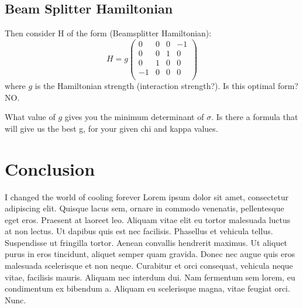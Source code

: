 \documentclass[11pt,a4paper]{article}
\numberwithin{equation}{section}
\begin{document}
	\subsection{Beam Splitter Hamiltonian}

	
	Then consider H of the form (Beamsplitter Hamiltonian):
	\begin{equation*}
	H = g\begin{pmatrix}
	0 & 0 & 0 & -1\\
	0 & 0 & 1 & 0\\
	0 & 1 & 0 & 0 \\
	-1 & 0 & 0 & 0 \\
	\end{pmatrix}
	\end{equation*} where $g$ is the Hamiltonian strength (interaction strength?). Is this optimal form? NO.
	
	What value of $g$ gives you the minimum determinant of $\sigma$. Is there a formula that will give us the best g, for your given chi and kappa values. 
	\fi	

	\color{red}\section{Conclusion}
	\label{sec:conc}
	
	
	I changed the world of cooling forever 
	Lorem ipsum dolor sit amet, consectetur adipiscing elit. Quisque lacus sem, ornare in commodo venenatis, pellentesque eget eros. Praesent at laoreet leo. Aliquam vitae elit eu tortor malesuada luctus at non lectus. Ut dapibus quis est nec facilisis. Phasellus et vehicula tellus. Suspendisse ut fringilla tortor. Aenean convallis hendrerit maximus. Ut aliquet purus in eros tincidunt, aliquet semper quam gravida. Donec nec augue quis eros malesuada scelerisque et non neque. Curabitur et orci consequat, vehicula neque vitae, facilisis mauris. Aliquam nec interdum dui. Nam fermentum sem lorem, eu condimentum ex bibendum a. Aliquam eu scelerisque magna, vitae feugiat orci. Nunc.
	\color{black}
	
	
	
	
	
	
\end{document}
